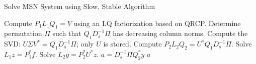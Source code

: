 \begin{algorithm}[t]
\caption{Solve MSN System using Slow, Stable Algorithm}
\label{alg:slow_msn_lq}
\begin{algorithmic}[1]
    \State Compute $P_{1}L_{1}Q_{1}=V$ using an LQ factorization
        based on QRCP.
    \State Determine permutation $\Pi$ such that $Q_{1}D_{s}^{-1}\Pi$
        has decreasing column norms.
    \State Compute the SVD:
        $U\Sigma V^{*} = Q_{1}D_{s}^{-1}\Pi$; only $U$ is stored.
    \State Compute $P_{2}L_{2}Q_{2} = U^{*}Q_{1}D_{s}^{-1}\Pi$.
    \State Solve $L_{1}z = P_{1}^{*}f$.
    \State Solve $L_{2}y = P_{2}^{*}U^{*}z$.
    \State $a = D_{s}^{-1}\Pi Q_{2}^{*}y$
    \State \Return $a$
\EndFunction
\end{algorithmic}
\end{algorithm}
